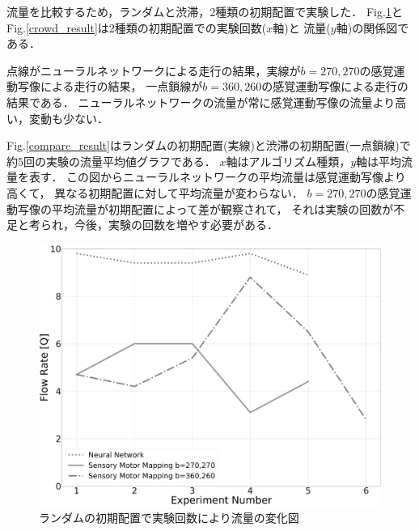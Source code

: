流量を比較するため，ランダムと渋滞，2種類の初期配置で実験した．
Fig.\ref{random_result}とFig.\ref{crowd_result}は2種類の初期配置での実験回数($x$軸)と
流量($y$軸)の関係図である．

点線がニューラルネットワークによる走行の結果，実線が$b=270,270$の感覚運動写像による走行の結果，
一点鎖線が$b=360,260$の感覚運動写像による走行の結果である．
ニューラルネットワークの流量が常に感覚運動写像の流量より高い，変動も少ない．

Fig.\ref{compare_result}はランダムの初期配置(実線)と渋滞の初期配置(一点鎖線)で
約5回の実験の流量平均値グラフである．
$x$軸はアルゴリズム種類，$y$軸は平均流量を表す．
この図からニューラルネットワークの平均流量は感覚運動写像より高くて，
異なる初期配置に対して平均流量が変わらない．
$b=270,270$の感覚運動写像の平均流量が初期配置によって差が観察されて，
それは実験の回数が不足と考られ，今後，実験の回数を増やす必要がある．


\vspace{-1mm}
\begin{figure}[!ht]
    \centering
    \includegraphics[width=0.9\linewidth]{result_diagrim_rand.eps}
    \caption{ランダムの初期配置で実験回数により流量の変化図}
    \label{random_result}
\end{figure}


